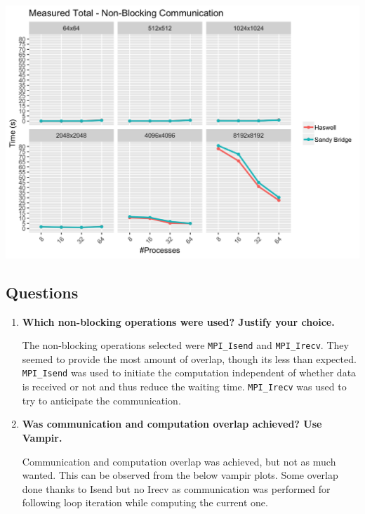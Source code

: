 \documentclass[10pt, letterpaper, twoside]{article}
\begin{document}
\begin{titlepage}
\begin{enumerate}
\includegraphics[scale = 0.18]{P2P_Measured-Total_InputSize.png}

\end{enumerate} 

\subsection{Questions}

\begin{enumerate}
\item\textbf{Which non-blocking operations were used? Justify your choice.} 
	
The non-blocking operations selected were \verb!MPI_Isend! and \verb!MPI_Irecv!. They seemed to provide the most amount of overlap, though its less than expected. \verb!MPI_Isend! was used to initiate the computation independent of whether data is received or not and thus reduce the waiting time. \verb!MPI_Irecv! was used to try to anticipate the communication.
    
\item\textbf{Was communication and computation overlap achieved? Use Vampir.} 
	
Communication and computation overlap was achieved, but not as much wanted. This can be observed from the below vampir plots. Some overlap done thanks to Isend but no Irecv as communication was performed for following loop iteration while computing the current one.


\end{enumerate}
\end{titlepage}
\end{document}
